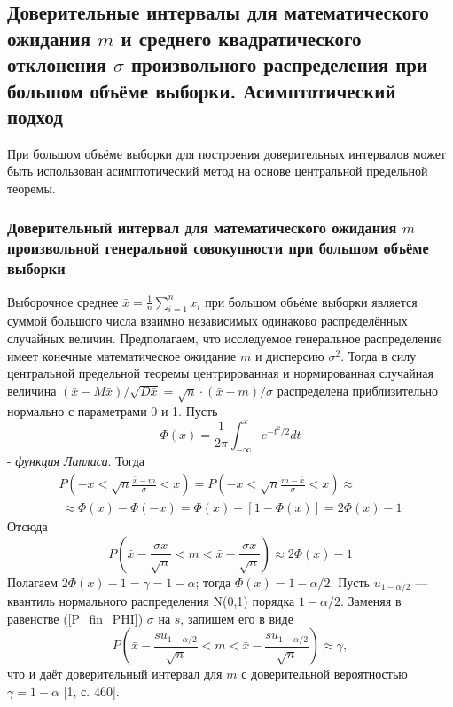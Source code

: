 \documentclass[a4paper,14pt]{article}
\begin{document}
	\subsection{Доверительные интервалы для математического ожидания $m$ и среднего квадратического отклонения $\sigma$ произвольного распределения при большом объёме выборки. Асимптотический подход}
	При большом объёме выборки для построения доверительных интервалов может быть использован асимптотический метод на основе центральной предельной теоремы.
	\subsubsection{Доверительный интервал для математического ожидания $m$ произвольной генеральной совокупности при большом объёме выборки}
	Выборочное среднее $\bar{x} = \frac{1}{n}\sum_{i = 1}^{n}{x_{i}}$ при большом объёме выборки является суммой большого числа взаимно независимых одинаково распределённых случайных величин. Предполагаем, что исследуемое генеральное распределение имеет конечные математическое ожидание $m$ и дисперсию $\sigma^{2}$. Тогда в силу центральной предельной теоремы центрированная и нормированная случайная величина $(\bar{x} - M\bar{x}) / \sqrt{D\bar{x}} = \sqrt{n}·(\bar{x}-m)/\sigma$ распределена приблизительно нормально с параметрами 0 и 1. Пусть
	\begin{equation}
		\Phi(x) = \frac{1}{2\pi}\int_{-\infty}^{x}{e^{-t^{2}/2}dt}
		\label{f_lapl}
	\end{equation}
	- \textit{функция Лапласа}. Тогда
	\begin{multline}
		P\left(-x < \sqrt{n}\frac{\bar{x} - m}{\sigma} < x \right) = 
		P\left(-x < \sqrt{n}\frac{m - \bar{x}}{\sigma} < x \right) \approx \\\
		\approx \Phi(x) - \Phi(-x)=\Phi(x) - [1 - \Phi(x)] = 2\Phi(x) - 1
		\label{P_PHI}
	\end{multline}
	Отсюда
	\begin{equation}
		P\left(\bar{x} - \frac{\sigma x}{\sqrt{n}} < m < \bar{x} - \frac{\sigma x}{\sqrt{n}} \right) \approx 2\Phi(x) - 1
		\label{P_fin_PHI}
	\end{equation}
	Полагаем $2\Phi(x) - 1 = \gamma = 1 - \alpha$; тогда $\Phi(x) = 1 - \alpha/2$. Пусть $u_{1-\alpha/2}$ — квантиль нормального распределения N(0,1) порядка $1-\alpha/2$. Заменяя в равенстве (\ref{P_fin_PHI}) $\sigma$ на $s$, запишем его в виде
	\begin{equation}
		P\left(\bar{x} - \frac{su_{1-\alpha/2}}{\sqrt{n}} < m < \bar{x} - \frac{su_{1-\alpha/2}}{\sqrt{n}} \right) \approx \gamma,
		\label{P_fin_u}
	\end{equation}
	что и даёт доверительный интервал для $m$ с доверительной вероятностью $\gamma = 1-\alpha$ [1, с. 460].
	
\end{document}
